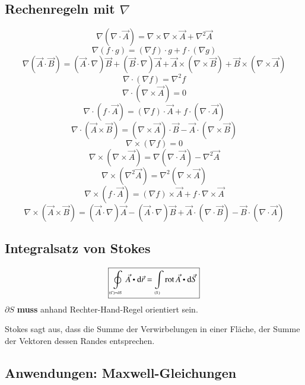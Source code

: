 \subsection{Rechenregeln mit $\nabla$} %
\[ \nabla(\nabla \cdot \vec{A}) = \nabla \times \nabla \times \vec{A} + \nabla^2 \vec{A}\]
\[ \nabla(f \cdot g) = (\nabla f) \cdot g + f \cdot (\nabla g) \]
\[ \nabla(\vec{A} \cdot \vec{B}) = (\vec{A} \cdot \nabla) \vec{B} + (\vec{B} \cdot \nabla) \vec{A} + \vec{A} \times (\nabla \times \vec{B}) + \vec{B} \times (\nabla \times \vec{A}) \]
\[ \nabla \cdot (\nabla f) = \nabla^2 f \]
\[ \nabla \cdot (\nabla \times \vec{A}) = 0 \]
\[ \nabla \cdot (f \cdot \vec{A}) = (\nabla f) \cdot \vec{A} + f \cdot (\nabla \cdot \vec{A}) \]
\[ \nabla \cdot (\vec{A} \times \vec{B}) = (\nabla \times \vec{A}) \cdot \vec{B} - \vec{A} \cdot (\nabla \times \vec{B}) \]
\[ \nabla \times (\nabla f) = 0 \]
\[ \nabla \times (\nabla \times \vec{A}) = \nabla (\nabla \cdot \vec{A}) - \nabla^2 \vec{A} \]
\[ \nabla \times (\nabla^2 \vec{A}) = \nabla^2 (\nabla \times \vec{A}) \]
\[ \nabla \times (f \cdot \vec{A}) = (\nabla f) \times \vec{A} + f \cdot \nabla \times \vec{A} \]
\[ \nabla \times (\vec{A} \times \vec{B}) = (\vec{A} \cdot \nabla) \vec{A} - (\vec{A} \cdot \nabla) \vec{B} + \vec{A} \cdot (\nabla \cdot \vec{B}) - \vec{B} \cdot (\nabla \cdot \vec{A}) \]


\subsection{Integralsatz von Stokes}
\[
    \boxed{\oint\limits_{\scriptscriptstyle (C) = \partial S} \vec{A} \dotp \diff \vec{r} = \int\limits_{\scriptscriptstyle (S)} \rot \vec{A} \dotp \diff \vec{S}}
\]
$\partial S$ \textbf{muss} anhand Rechter-Hand-Regel orientiert sein.

Stokes sagt aus, dass die Summe der Verwirbelungen in einer Fläche, der Summe der Vektoren dessen Randes entsprechen.

\subsection{Anwendungen: Maxwell-Gleichungen}


